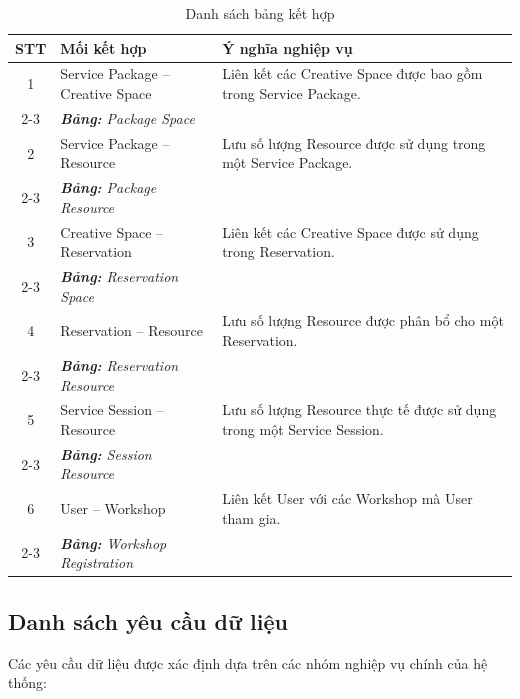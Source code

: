 \begin{table}[htbp]
\centering
\begin{tabular}{|c|l|p{7cm}|}
\hline
\textbf{STT} & \textbf{Mối kết hợp} & \textbf{Ý nghĩa nghiệp vụ} \\
\hline
1 & Service Package \newline-- Creative Space & Liên kết các Creative Space được bao gồm trong Service Package. \\
\cline{2-3}
& \textit{\textbf{Bảng:} Package Space} & \\
\hline
2 & Service Package \newline-- Resource & Lưu số lượng Resource được sử dụng trong một Service Package. \\
\cline{2-3}
& \textit{\textbf{Bảng:} Package Resource} & \\
\hline
3 & Creative Space \newline-- Reservation & Liên kết các Creative Space được sử dụng trong Reservation. \\
\cline{2-3}
& \textit{\textbf{Bảng:} Reservation Space} & \\
\hline
4 & Reservation \newline-- Resource & Lưu số lượng Resource được phân bổ cho một Reservation. \\
\cline{2-3}
& \textit{\textbf{Bảng:} Reservation Resource} & \\
\hline
5 & Service Session \newline-- Resource & Lưu số lượng Resource thực tế được sử dụng trong một Service Session. \\
\cline{2-3}
& \textit{\textbf{Bảng:} Session Resource} & \\
\hline
6 & User \newline-- Workshop & Liên kết User với các Workshop mà User tham gia. \\
\cline{2-3}
& \textit{\textbf{Bảng:} Workshop Registration} & \\
\hline
\end{tabular}
\caption{Danh sách bảng kết hợp}
\end{table}

\subsection{Danh sách yêu cầu dữ liệu}

Các yêu cầu dữ liệu được xác định dựa trên các nhóm nghiệp vụ chính của hệ thống:


